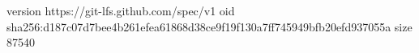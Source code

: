 version https://git-lfs.github.com/spec/v1
oid sha256:d187c07d7bee4b261efea61868d38ce9f19f130a7ff745949bfb20efd937055a
size 87540
